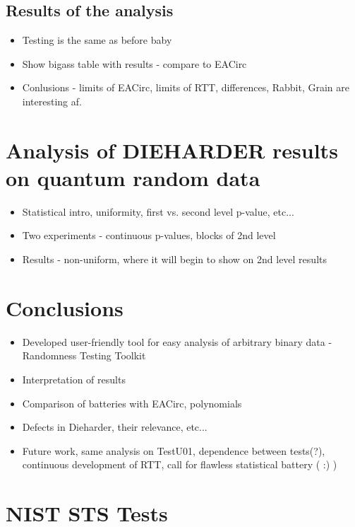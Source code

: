 \documentclass[
  digital,  	%
  color,		%
  oneside,   	%
  12pt,
  nocover,
  notable,
  nolof,
  nolot,
]{fithesis3}
\begin{document}
\section{Results of the analysis}
\begin{itemize}
\item Testing is the same as before baby
\item Show bigass table with results - compare to EACirc
\item Conlusions - limits of EACirc, limits of RTT, differences, Rabbit, Grain are interesting af.
\end{itemize}

\chapter{Analysis of DIEHARDER results on quantum random data}
\begin{itemize}
\item Statistical intro, uniformity, first vs. second level p-value, etc...
\item Two experiments - continuous p-values, blocks of 2nd level
\item Results - non-uniform, where it will begin to show on 2nd level results
\end{itemize}

\chapter{Conclusions}
\begin{itemize}
\item Developed user-friendly tool for easy analysis of arbitrary binary data - Randomness Testing Toolkit
\item Interpretation of results
\item Comparison of batteries with EACirc, polynomials
\item Defects in Dieharder, their relevance, etc...
\item Future work, same analysis on TestU01, dependence between tests(?), continuous development of RTT, call for flawless statistical battery ( :) )
\end{itemize}

\appendix

\printbibliography

\chapter{NIST STS Tests}
\label{app:nist_sts_tests}
\end{document}
